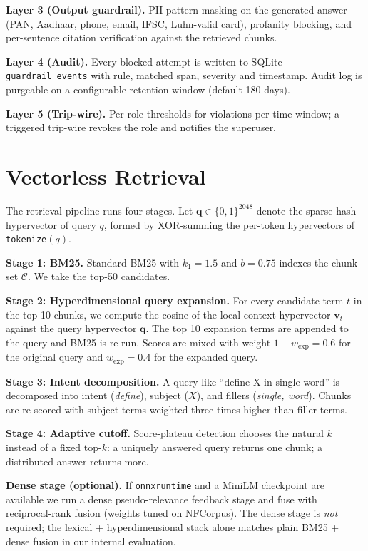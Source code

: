 \documentclass[conference]{IEEEtran}
\begin{document}
\textbf{Layer 3 (Output guardrail).}  PII pattern masking on the
generated answer (PAN, Aadhaar, phone, email, IFSC, Luhn-valid card),
profanity blocking, and per-sentence citation verification against
the retrieved chunks.

\textbf{Layer 4 (Audit).}  Every blocked attempt is written to
SQLite \texttt{guardrail\_events} with rule, matched span, severity
and timestamp.  Audit log is purgeable on a configurable retention
window (default 180 days).

\textbf{Layer 5 (Trip-wire).}  Per-role thresholds for violations
per time window; a triggered trip-wire revokes the role and
notifies the superuser.

\section{Vectorless Retrieval}
\label{sec:retrieval}

The retrieval pipeline runs four stages.  Let
$\mathbf{q} \in \{0,1\}^{2048}$ denote the sparse hash-hypervector
of query $q$, formed by XOR-summing the per-token hypervectors of
\texttt{tokenize}$(q)$.

\textbf{Stage 1: BM25.}  Standard BM25 with $k_1=1.5$ and $b=0.75$
indexes the chunk set $\mathcal{C}$.  We take the top-50
candidates.

\textbf{Stage 2: Hyperdimensional query expansion.}  For every
candidate term $t$ in the top-10 chunks, we compute the cosine of
the local context hypervector $\mathbf{v}_t$ against the query
hypervector $\mathbf{q}$.  The top 10 expansion terms are appended
to the query and BM25 is re-run.  Scores are mixed with weight
$1-w_{\textrm{exp}}=0.6$ for the original query and $w_{\textrm{exp}}=0.4$
for the expanded query.

\textbf{Stage 3: Intent decomposition.}  A query like ``define X in
single word'' is decomposed into intent (\emph{define}), subject
($X$), and fillers (\emph{single, word}).  Chunks are re-scored
with subject terms weighted three times higher than filler terms.

\textbf{Stage 4: Adaptive cutoff.}  Score-plateau detection chooses
the natural $k$ instead of a fixed top-$k$: a uniquely answered
query returns one chunk; a distributed answer returns more.

\textbf{Dense stage (optional).}  If \texttt{onnxruntime} and a
MiniLM checkpoint are available we run a dense pseudo-relevance
feedback stage and fuse with reciprocal-rank fusion (weights tuned
on NFCorpus).  The dense stage is \emph{not} required; the lexical
+ hyperdimensional stack alone matches plain BM25 + dense fusion in
our internal evaluation.
\end{document}
